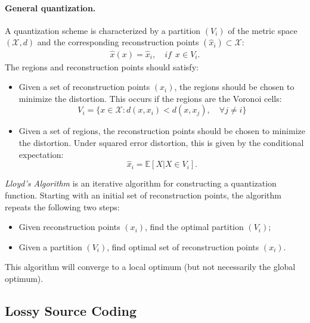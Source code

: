 \documentclass{article}
\numberwithin{equation}{section}
\newcommand{\E}{\mathbb{E}}
\renewcommand{\cal}{\mathcal}
\theoremstyle{plain}
\theoremstyle{definition}
\begin{document}
\paragraph{General quantization.} A quantization scheme is characterized by a partition $(V_i)$ of the metric space $(\cal{X},d)$ and the corresponding reconstruction points $(\hat{x}_i)\subset\cal{X}$:
\begin{align*}
	\hat{x}(x)=\hat{x}_i,\quad \textit{if}\ \ x\in V_i.
\end{align*}
The regions and reconstruction points should satisfy:
\begin{itemize}
\item Given a set of reconstruction points $(x_i)$, the regions should be chosen to minimize the distortion. This occurs if the regions are the Voronoi
cells:
$$V_i = \{x\in\cal{X}:d(x,x_i) < d(x,x_j),\quad\forall j \neq i\}$$
\item Given a set of regions, the reconstruction points should be chosen to minimize the distortion. Under squared error distortion, this is given by the conditional expectation:
$$\hat{x}_i=\E\left[X|X\in V_i\right].$$
\end{itemize}
\textit{Lloyd's Algorithm} is an iterative algorithm for constructing a quantization function. Starting with an initial set of reconstruction points, the algorithm repeats the following two steps:
\begin{itemize}
\item Given reconstruction points $(x_i)$, find the optimal partition $(V_i)$;
\item Given a partition $(V_i)$, find optimal set of reconstruction points $(x_i)$.
\end{itemize}
This algorithm will converge to a local optimum (but not necessarily the global optimum).

\subsection{Lossy Source Coding}
\end{document}
